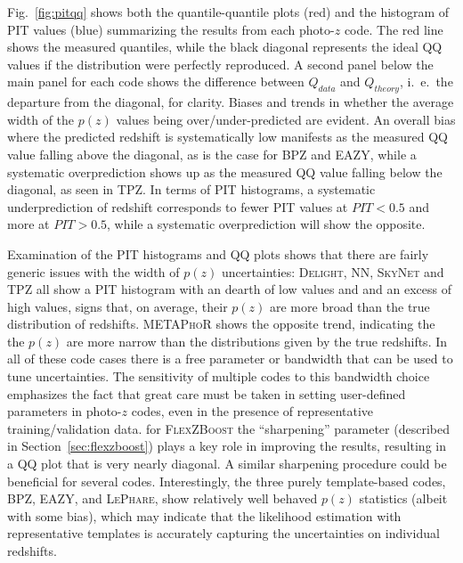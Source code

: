 \documentclass[usenatbib]{mn2e}
\begin{document}
Fig.~\ref{fig:pitqq} shows both the quantile-quantile plots (red) and the histogram of PIT values (blue) summarizing the results from each photo-$z$ code.  The red line shows the measured quantiles, while the black diagonal represents the ideal QQ values if the distribution were perfectly reproduced.  A second panel below the main panel for each code shows the difference between $Q_{data}$ and $Q_{theory}$, i.~e.~the departure from the diagonal, for clarity.
Biases and trends in whether the average width of the $p(z)$ values being over/under-predicted are evident.  An overall bias where the predicted redshift is systematically low manifests as the measured QQ value falling above the diagonal, as is the case for \textsc{BPZ} and \textsc{EAZY}, while a systematic overprediction shows up as the measured QQ value falling below the diagonal, as seen in \textsc{TPZ}.  In terms of PIT histograms, a systematic underprediction of redshift corresponds to fewer PIT values at $PIT<0.5$ and more at $PIT>0.5$, while a systematic overprediction will show the opposite.

Examination of the PIT histograms and QQ plots shows that there are fairly generic issues with the width of $p(z)$ uncertainties: \textsc{Delight, NN, SkyNet} and \textsc{TPZ} all show a PIT histogram with an dearth of low values and and an excess of high values, signs that, on average, their $p(z)$ are more broad than the true distribution of redshifts.  \textsc{METAPhoR} shows the opposite trend, indicating the the $p(z)$  are more narrow than the distributions given by the true redshifts.  In all of these code cases there is a free parameter or bandwidth that can be used to tune uncertainties.  The sensitivity of multiple codes to this bandwidth choice emphasizes the fact that great care must be taken in setting user-defined parameters in photo-$z$ codes, even in the presence of representative training/validation data.  for \textsc{FlexZBoost} the ``sharpening'' parameter (described in Section~\ref{sec:flexzboost}) plays a key role in improving the results, resulting in a QQ plot that is very nearly diagonal.  A similar sharpening procedure could be beneficial for several codes.
Interestingly, the three purely template-based codes, \textsc{BPZ, EAZY}, and \textsc{LePhare}, show relatively well behaved $p(z)$ statistics (albeit with some bias), which may indicate that the likelihood estimation with representative templates is accurately capturing the uncertainties on individual redshifts. 
\end{document}
